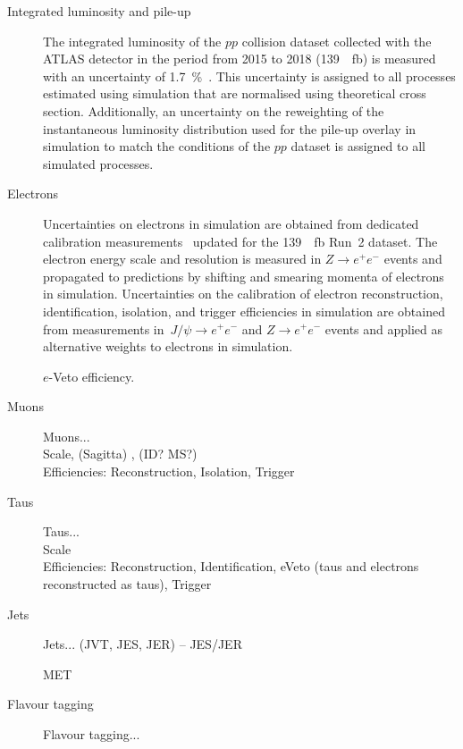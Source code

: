 \begin{description}
\item[Integrated luminosity and pile-up] The integrated luminosity of
  the $pp$ collision dataset collected with the ATLAS detector in the
  period from 2015 to 2018 (\SI{139}{\per\femto\barn}) is measured
  with an uncertainty of
  \SI{1.7}{\percent}~\cite{ATLAS-CONF-2019-021}. This uncertainty is
  assigned to all processes estimated using simulation that are
  normalised using theoretical cross section. Additionally, an
  uncertainty on the reweighting of the instantaneous luminosity
  distribution used for the pile-up overlay in simulation to match the
  conditions of the $pp$ dataset is assigned to all simulated
  processes.

\item[Electrons] Uncertainties on electrons in simulation are obtained
  from dedicated calibration
  measurements~\cite{EGAM-2018-01,TRIG-2018-05} updated for the
  \SI{139}{\per\femto\barn} Run~2 dataset. The electron energy scale
  and resolution is measured in $Z \to e^+e^-$ events and propagated
  to predictions by shifting and smearing momenta of electrons in
  simulation. Uncertainties on the calibration of electron
  reconstruction, identification, isolation, and trigger efficiencies
  in simulation are obtained from measurements in~$J/\psi \to e^+e^-$
  and $Z \to e^+e^-$ events and applied as alternative weights to
  electrons in simulation.

  $e$-Veto efficiency.

\item[Muons]
  Muons... \cite{MUON-2018-03} \\
  Scale, (Sagitta) , (ID? MS?) \\
  Efficiencies: Reconstruction, Isolation, Trigger

\item[Taus]
  Taus... \\
  Scale \\
  Efficiencies: Reconstruction, Identification, eVeto (taus and
  electrons reconstructed as taus), Trigger

\item[Jets] Jets... (JVT, JES, JER) -- JES/JER \cite{JETM-2018-05}

\item[\pTmissAbs] MET

\item[Flavour tagging] Flavour tagging... \cite{FTAG-2018-01}

\end{description}


